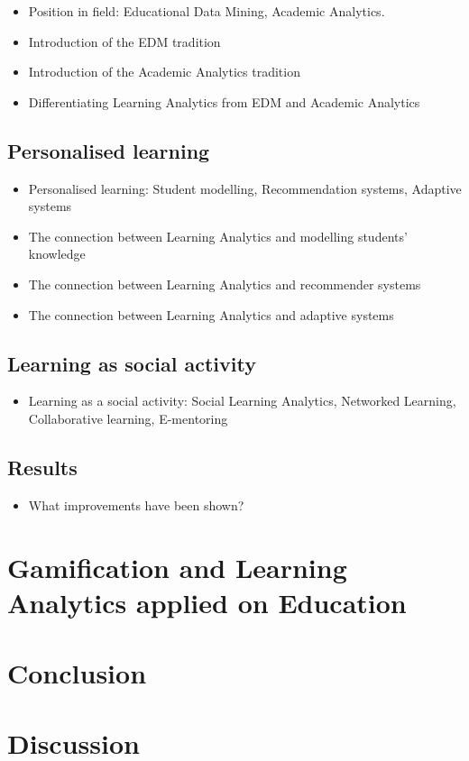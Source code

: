 \documentclass[11pt]{article}
\begin{document}
\cite{Ferguson2012a} \cite{Greller2012}
\begin{itemize}
\item Position in field: Educational Data Mining, Academic Analytics.
\item Introduction of the EDM tradition
\item Introduction of the Academic Analytics tradition
\item Differentiating Learning Analytics from EDM and Academic Analytics
\end{itemize}
\subsection{Personalised learning}
\begin{itemize}
\item Personalised learning: Student modelling, Recommendation systems, Adaptive systems
\item The connection between Learning Analytics and modelling students’ knowledge
\item The connection between Learning Analytics and recommender systems
\item The connection between Learning Analytics and adaptive systems
\end{itemize}
\subsection{Learning as social activity}
\begin{itemize}
\item Learning as a social activity: Social Learning Analytics, Networked Learning, Collaborative learning, E-mentoring
\end{itemize}
\subsection{Results}
\begin{itemize}
\item What improvements have been shown?
\end{itemize}


\section{Gamification and Learning Analytics applied on Education}



\section{Conclusion}

\section{Discussion}


\pagebreak


\end{document}
